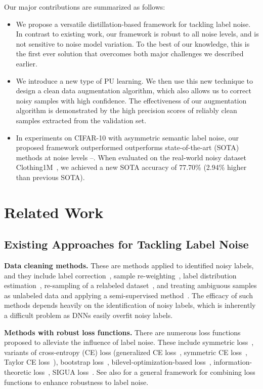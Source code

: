 \documentclass[conference]{IEEEtran}
\begin{document}
Our major contributions are summarized as follows:
\begin{itemize}
\item We propose a versatile distillation-based framework for tackling label noise.
In contrast to existing work, our framework is robust to all noise levels, and is not sensitive to noise model variation. To the best of our knowledge, this is the first ever solution that overcomes both major challenges we described earlier.

\item We introduce a new type of PU learning.
We then use this new technique to design a clean data augmentation algorithm, which also allows us to correct noisy samples with high confidence.
The effectiveness of our augmentation algorithm is demonstrated by the high precision scores of reliably clean samples extracted from the validation set.

\item In experiments on CIFAR-10 \cite{krizhevsky2009learning} with asymmetric semantic label noise, our proposed framework outperformed outperforms state-of-the-art (SOTA) methods at noise levels --. When evaluated on the real-world noisy dataset Clothing1M~\cite{xiao2015learning}, we achieved a new SOTA accuracy of 77.70\% (2.94\% higher than previous SOTA).
\end{itemize}

\section{Related Work}
\label{sec: related work}
\subsection{Existing Approaches for Tackling Label Noise}
\noindent\textbf{Data cleaning methods.} 
These are methods applied to identified noisy labels, and they include 
label correction~\cite{tanaka2018joint}, sample re-weighting~\cite{shu2019meta, jiang2018mentornet, zhang2019metacleaner}, 
label distribution estimation~\cite{yi2019probabilistic}, re-sampling of a relabeled dataset~\cite{wu2018light}, and treating ambiguous samples as unlabeled data and applying a semi-supervised method~\cite{Ding2018AST}.
The efficacy of such methods depends heavily on the identification of noisy labels, which is inherently a difficult problem as DNNs easily overfit noisy labels.

\noindent\textbf{Methods with robust loss functions.} There are numerous loss functions proposed to alleviate the influence of label noise. These include symmetric loss~\cite{ghosh2017robust}, variants of cross-entropy (CE) loss (generalized CE loss~\cite{wang2019symmetric}, symmetric CE loss~\cite{wang2019symmetric}, Taylor CE loss~\cite{feng2020can}), bootstrap loss~\cite{arazo2019unsupervised, reed2014training}, bilevel-optimization-based loss~\cite{jenni2018deep}, information-theoretic loss~\cite{xu2019l_dmi}, SIGUA loss~\cite{han2020sigua}. See also \cite{ma2020normalized} for a general framework for combining loss functions to enhance robustness to label noise.
\end{document}
